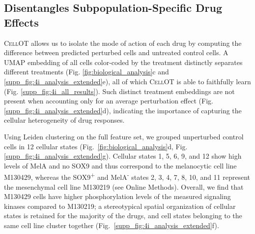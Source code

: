
\subsection{Disentangles Subpopulation-Specific Drug Effects}
\textsc{CellOT} allows us to 
isolate the mode of action of each drug by computing the difference between predicted perturbed cells and untreated control cells. %
A UMAP embedding of all cells color-coded by the treatment distinctly separates different treatments (Fig. \ref{fig:biological_analysis}c and \ref{supp_fig:4i_analysis_extended}e), all of which \textsc{CellOT} is able to faithfully learn (Fig. \ref{supp_fig:4i_all_results}).
Such distinct treatment embeddings are not present when accounting only for an average perturbation effect (Fig. \ref{supp_fig:4i_analysis_extended}d), indicating the importance of capturing the cellular heterogeneity of drug responses.

 Using Leiden clustering on the full feature set, we grouped unperturbed control cells in 12 cellular states (Fig.~\ref{fig:biological_analysis}d, Fig. \ref{supp_fig:4i_analysis_extended}g). Cellular states 1, 5, 6, 9, and 12 show high levels of MelA and no SOX9 and thus correspond to the melanocytic cell line M130429, whereas the SOX9\textsuperscript{+} and MelA\textsuperscript{-} states 2, 3, 4, 7, 8, 10, and 11 represent the mesenchymal cell line M130219 (see Online Methods). Overall, we find that M130429 cells have higher phosphorylation levels of the measured signaling kinases compared to M130219;
a stereotypical spatial organization of cellular states is retained for the majority of the drugs,  and cell states belonging to the same cell line cluster together (Fig.~\ref{supp_fig:4i_analysis_extended}f). 

